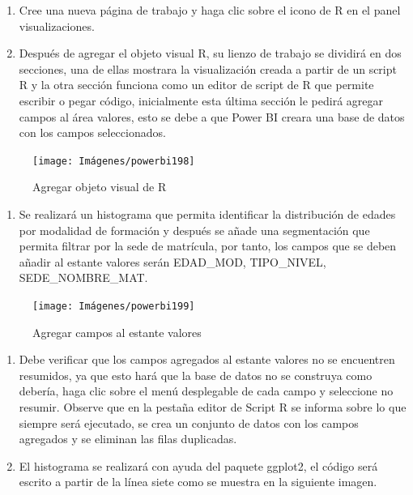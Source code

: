 \documentclass[
]{book}
\providecommand{\tightlist}{%
  \setlength{\itemsep}{0pt}\setlength{\parskip}{0pt}}
\begin{document}
\begin{enumerate}
\def\labelenumi{\arabic{enumi}.}
\item
  Cree una nueva página de trabajo y haga clic sobre el icono de R en el panel visualizaciones.
\item
  Después de agregar el objeto visual R, su lienzo de trabajo se dividirá en dos secciones, una de ellas mostrara la visualización creada a partir de un script R y la otra sección funciona como un editor de script de R que permite escribir o pegar código, inicialmente esta última sección le pedirá agregar campos al área valores, esto se debe a que Power BI creara una base de datos con los campos seleccionados.
\end{enumerate}

\begin{figure}

{\centering \texttt{[image: Imágenes/powerbi198]} 

}

\caption{Agregar objeto visual de R}\label{fig:paso2histogramapowerbi-fig}
\end{figure}

\begin{enumerate}
\def\labelenumi{\arabic{enumi}.}
\setcounter{enumi}{2}
\tightlist
\item
  Se realizará un histograma que permita identificar la distribución de edades por modalidad de formación y después se añade una segmentación que permita filtrar por la sede de matrícula, por tanto, los campos que se deben añadir al estante valores serán EDAD\_MOD, TIPO\_NIVEL, SEDE\_NOMBRE\_MAT.
\end{enumerate}

\begin{figure}

{\centering \texttt{[image: Imágenes/powerbi199]} 

}

\caption{Agregar campos al estante valores}\label{fig:paso3histogramapowerbi-fig}
\end{figure}

\begin{enumerate}
\def\labelenumi{\arabic{enumi}.}
\setcounter{enumi}{3}
\item
  Debe verificar que los campos agregados al estante valores no se encuentren resumidos, ya que esto hará que la base de datos no se construya como debería, haga clic sobre el menú desplegable de cada campo y seleccione no resumir. Observe que en la pestaña editor de Script R se informa sobre lo que siempre será ejecutado, se crea un conjunto de datos con los campos agregados y se eliminan las filas duplicadas.
\item
  El histograma se realizará con ayuda del paquete ggplot2, el código será escrito a partir de la línea siete como se muestra en la siguiente imagen.
\end{enumerate}
\end{document}
